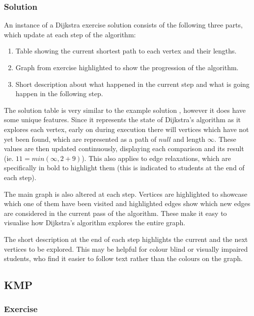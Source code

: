 \documentclass{l4proj}
\begin{document}
\subsubsection{Solution}

An instance of a Dijkstra exercise solution consists of the following three parts, which update at each step of the algorithm:

\begin{enumerate}
	\item
	Table showing the current shortest path to each vertex and their lengths.
	\item
	Graph from exercise highlighted to show the progression of the algorithm.
	\item
	Short description about what happened in the current step and what is going happen in the following step.
\end{enumerate}

The solution table is very similar to the example solution \cite{a}, however it does have some unique features. Since it represents the state of Dijkstra's algorithm as it explores each vertex, early on during execution there will vertices which have not yet been found, which are represented as a path of $null$ and length $\infty$. These values are then updated continuously, displaying each comparison and its result (ie. $11 = min(\infty, 2+9)$). This also applies to edge relaxations, which are specifically in bold to highlight them (this is indicated to students at the end of each step).

The main graph is also altered at each step. Vertices are highlighted to showcase which one of them have been visited and highlighted edges show which new edges are considered in the current pass of the algorithm. These make it easy to visualise how Dijkstra's algorithm explores the entire graph.

The short description at the end of each step highlights the current and the next vertices to be explored. This may be helpful for colour blind or visually impaired students, who find it easier to follow text rather than the colours on the graph.

\subsection{KMP}

\subsubsection{Exercise}
\label{sec:KMPExerciseDesign}
\end{document}
